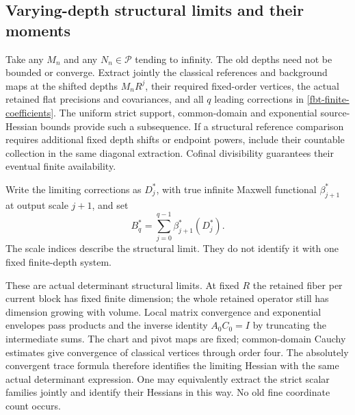 \subsection{Varying-depth structural limits and their moments}
\label{fbt-compactness}

Take any \(M_n\) and any \(N_n\in\mathcal P\) tending to
infinity. The old depths need not be bounded or converge.
Extract jointly the classical references and background
maps at the shifted depths \(M_nR^j\), their required
fixed-order vertices, the actual retained flat precisions
and covariances, and all \(q\) leading corrections in
\eqref{fbt-finite-coefficients}.
The uniform strict support, common-domain and exponential
source-Hessian bounds provide such a subsequence. If a
structural reference comparison requires additional fixed
depth shifts or endpoint powers, include their countable
collection in the same diagonal extraction. Cofinal
divisibility guarantees their eventual finite availability.

Write the limiting corrections as \(D_j^*\), with true
infinite Maxwell functional \(\beta_{j+1}^*\) at output
scale \(j+1\), and set
\begin{equation}
                       B_q^*=\sum_{j=0}^{q-1}
                                         \beta_{j+1}^*(D_j^*).
 \label{fbt-limit-sum}
\end{equation}
The scale indices describe the structural limit. They
do not identify it with one fixed finite-depth system.

These are actual determinant structural limits. At fixed
\(R\) the retained fiber per current block has fixed finite dimension;
the whole retained operator still has dimension growing with volume.
Local matrix convergence and exponential envelopes pass
products and the inverse identity \(A_0C_0=I\) by truncating
the intermediate sums. The chart and pivot maps are fixed;
common-domain Cauchy estimates give convergence of classical
vertices through order four. The absolutely convergent
trace formula therefore identifies the limiting Hessian
with the same actual determinant expression. One may
equivalently extract the strict scalar families jointly
and identify their Hessians in this way. No old fine
coordinate count occurs.

